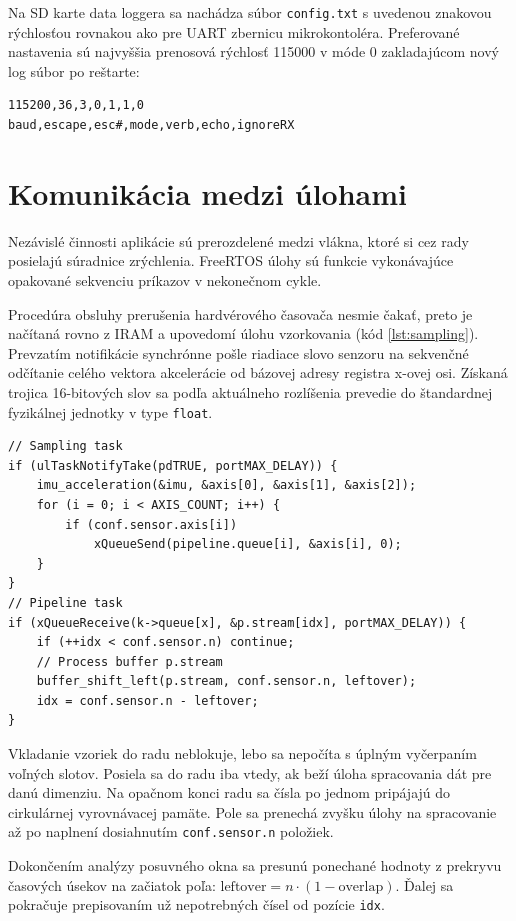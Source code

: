 Na SD karte data loggera sa nachádza súbor \verb|config.txt| s uvedenou znakovou rýchlosťou
rovnakou ako pre UART zbernicu mikrokontoléra. Preferované nastavenia sú najvyššia prenosová rýchlosť 115000
v móde 0 zakladajúcom nový log súbor po reštarte:
\begin{lstlisting}[style=implementation]
115200,36,3,0,1,1,0
baud,escape,esc#,mode,verb,echo,ignoreRX
\end{lstlisting}

\section{Komunikácia medzi úlohami}
Nezávislé činnosti aplikácie sú prerozdelené medzi vlákna, ktoré si cez rady posielajú súradnice zrýchlenia.
FreeRTOS úlohy sú funkcie vykonávajúce opakované sekvenciu príkazov v nekonečnom cykle.

Procedúra obsluhy prerušenia hardvérového časovača nesmie čakať, preto je načítaná rovno z IRAM a upovedomí úlohu vzorkovania
(kód \ref{lst:sampling}). Prevzatím notifikácie synchrónne pošle riadiace slovo senzoru na sekvenčné odčítanie celého vektora
akcelerácie od bázovej adresy registra x-ovej osi. Získaná trojica 16-bitových slov sa podľa aktuálneho rozlíšenia prevedie
do štandardnej fyzikálnej jednotky v type \verb|float|.

\begin{lstlisting}[style=cstyle,caption=Posielanie vzoriek medzi úlohami cez rad správ,label={lst:sampling},
 morekeywords={ulTaskNotifyTake,xQueueSend,xQueueReceive,buffer_shift_left,p.stream}]
// Sampling task
if (ulTaskNotifyTake(pdTRUE, portMAX_DELAY)) {
	imu_acceleration(&imu, &axis[0], &axis[1], &axis[2]);
	for (i = 0; i < AXIS_COUNT; i++) {
    	if (conf.sensor.axis[i])
        	xQueueSend(pipeline.queue[i], &axis[i], 0);
    }
}
// Pipeline task
if (xQueueReceive(k->queue[x], &p.stream[idx], portMAX_DELAY)) {
	if (++idx < conf.sensor.n) continue;
    // Process buffer p.stream
    buffer_shift_left(p.stream, conf.sensor.n, leftover);
    idx = conf.sensor.n - leftover;
}
\end{lstlisting}
Vkladanie vzoriek do radu neblokuje, lebo sa nepočíta s úplným vyčerpaním voľných slotov. Posiela sa do radu
iba vtedy, ak beží úloha spracovania dát pre danú dimenziu. Na opačnom konci radu sa čísla po jednom pripájajú do
cirkulárnej vyrovnávacej pamäte. Pole sa prenechá zvyšku úlohy na spracovanie až po naplnení
dosiahnutím \verb|conf.sensor.n| položiek.

Dokončením analýzy posuvného okna sa presunú ponechané hodnoty z prekryvu časových úsekov na začiatok
poľa: $\mathrm{leftover} = n \cdot (1 - \mathrm{overlap})$. Ďalej sa pokračuje prepisovaním už nepotrebných čísel od pozície \verb|idx|.

